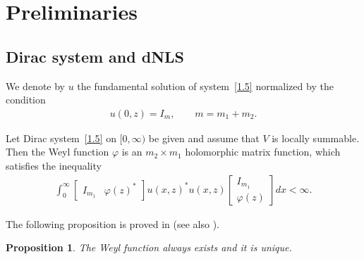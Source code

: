 \documentclass[pdftex]{sigma}
\newtheorem{Proposition}[Theorem]{Proposition}
{\theoremstyle{definition}
\newtheorem{Definition}[Theorem]{Definition}
\newtheorem{Notation}[Theorem]{Notation}
\newtheorem{Example}[Theorem]{Example}
\newtheorem{Remark}[Theorem]{Remark}
}
\def\vp{\varphi}
\numberwithin{equation}{section}
\begin{document}
\section{Preliminaries} \label{Prel}

\subsection{Dirac system and dNLS}

We denote by $u$ the fundamental solution of system~\eqref{1.5} normalized by
the condition
\begin{gather*}  %
u(0,z)=I_m, \qquad m=m_1+m_2.
\end{gather*}
\begin{Definition} \label{CyW2} Let Dirac system~\eqref{1.5} on $[0, \infty)$
 be given and assume that $V$ is locally summable.
Then the Weyl function $\vp$ is an $m_2 \times m_1$ holomorphic matrix function, which satisf\/ies the inequality
\begin{gather}  \label{2.0}
\int_0^{\infty}
\begin{bmatrix}
I_{m_1} & \vp(z)^*
\end{bmatrix}
u(x,z)^*u(x,z)
\begin{bmatrix}
I_{m_1} \\ \vp(z)
\end{bmatrix}dx< \infty .
\end{gather}
\end{Definition}

The following proposition is proved in \cite{FKRSp1} (see also \cite[Section~2.2]{SaSaR}).
\begin{Proposition} The Weyl function always exists and it is unique.
\end{Proposition}
\end{document}
